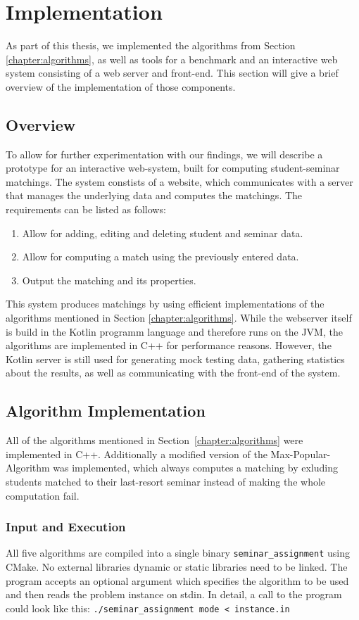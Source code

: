 \section{Implementation}

As part of this thesis, we implemented the algorithms from Section \ref{chapter:algorithms}, as well as tools for a benchmark and an interactive web system consisting of a web server and front-end. This section will give a brief overview of the implementation of those components.

\subsection{Overview}
To allow for further experimentation with our findings, we will describe a prototype for an interactive web-system, built for computing student-seminar matchings. The system constists of a website, which communicates with a server that manages the underlying data and computes the matchings. The requirements can be listed as follows:
\begin{enumerate}
    \item Allow for adding, editing and deleting student and seminar data.
    \item Allow for computing a match using the previously entered data.
    \item Output the matching and its properties.
\end{enumerate}
This system produces matchings by using efficient implementations of the algorithms mentioned in Section \ref{chapter:algorithms}. While the webserver itself is build in the Kotlin programm language and therefore runs on the JVM, the algorithms are implemented in C++ for performance reasons. However, the Kotlin server is still used for generating mock testing data, gathering statistics about the results, as well as communicating with the front-end of the system.

\subsection{Algorithm Implementation}
All of the algorithms mentioned in \mbox{Section \ref{chapter:algorithms}} were implemented in C++. Additionally a modified version of the Max-Popular-Algorithm was implemented, which always computes a matching by exluding students matched to their last-resort seminar instead of making the whole computation fail.

\subsubsection{Input and Execution}
All five algorithms are compiled into a single binary \lstinline{seminar_assignment} using CMake. No external libraries dynamic or static libraries need to be linked. The program accepts an optional argument which specifies the algorithm to be used and then reads the problem instance on stdin. In detail, a call to the program could look like this: \lstinline{./seminar_assignment mode < instance.in} 

